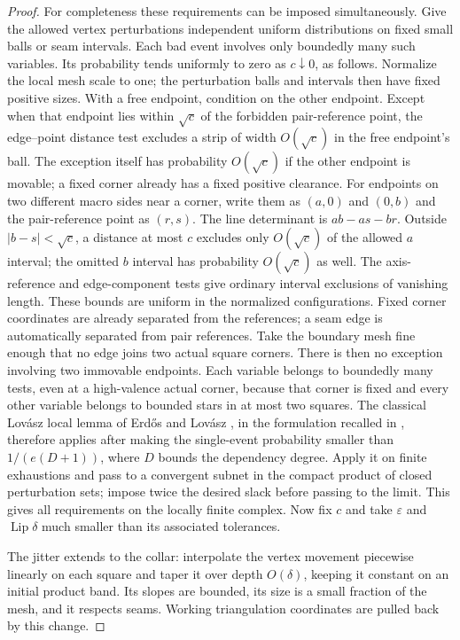 \documentclass[11pt]{article}
\numberwithin{equation}{section}
\theoremstyle{definition}
\theoremstyle{remark}
\begin{document}
\begin{proof}
For completeness these requirements can be imposed simultaneously.
Give the allowed vertex perturbations independent uniform
distributions on fixed small balls or seam intervals.  Each bad event
involves only boundedly many such variables.  Its probability tends
uniformly to zero as $c\downarrow0$, as follows.  Normalize the local
mesh scale to one; the perturbation balls and intervals then have
fixed positive sizes.  With a free endpoint, condition on the other
endpoint.  Except when that endpoint lies within $\sqrt c$ of the
forbidden pair-reference point, the edge--point distance test excludes
a strip of width $O(\sqrt c)$ in the free endpoint's ball.  The
exception itself has probability $O(\sqrt c)$ if the other endpoint
is movable; a fixed corner already has a fixed positive clearance.
For endpoints on two different macro sides near a corner, write them
as $(a,0)$ and $(0,b)$ and the pair-reference point as $(r,s)$.
The line determinant is $ab-as-br$.  Outside
$|b-s|<\sqrt c$, a distance at most $c$ excludes only
$O(\sqrt c)$ of the allowed $a$ interval; the omitted $b$ interval
has probability $O(\sqrt c)$ as well.  The axis-reference and
edge-component tests give ordinary interval exclusions of vanishing
length.  These bounds are uniform in the normalized configurations.
Fixed corner
coordinates are already separated from the references; a seam edge
is automatically separated from pair references.  Take the boundary
mesh fine enough that no edge joins two actual square corners.
There is then no exception involving two immovable endpoints.
Each variable belongs
to boundedly many tests, even at a high-valence actual corner,
because that corner is fixed and every other variable belongs to
bounded stars in at most two squares.  The classical Lov\'asz local lemma of Erd\H{o}s and Lov\'asz
\cite{ErdosLovasz1975}, in the formulation recalled in
\cite[Theorem~1.1]{MoserTardos2010},
therefore applies after making the single-event probability smaller
than $1/(e(D+1))$, where $D$ bounds the dependency degree.  Apply it on
finite exhaustions and pass to a convergent subnet in the compact
product of closed perturbation sets; impose twice the desired slack
before passing to the limit.  This gives all requirements on the
locally finite complex.  Now fix $c$ and take $\varepsilon$ and
$\operatorname{Lip}\delta$ much smaller than its associated tolerances.

The jitter extends to the collar: interpolate the vertex movement
piecewise linearly on each square and taper it over depth
$O(\delta)$, keeping it constant on an initial product band.
Its slopes are bounded, its size is a small fraction of the mesh,
and it respects seams.  Working triangulation coordinates are pulled
back by this change.


\end{proof}
\end{document}
